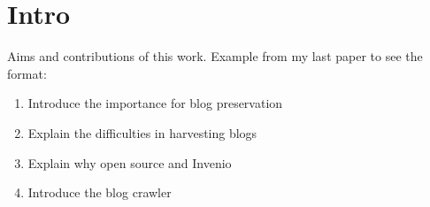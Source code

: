 \section{Intro}

Aims and contributions of this work. Example from my last paper to see the format:

\begin{enumerate}
  \item Introduce the importance for blog preservation
  \item Explain the difficulties in harvesting blogs
  \item Explain why open source and Invenio
  \item Introduce the blog crawler
\end{enumerate}
